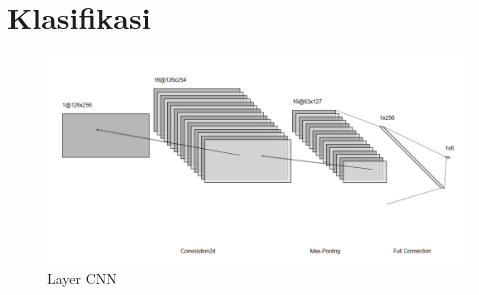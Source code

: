 \section{Klasifikasi}

\begin{figure}[!h]
  \centering
  \includegraphics[width=1\linewidth]{../Gambar/LayerCnn.png}
  \caption{Layer CNN}
  \label{fig:layerCNn}
\end{figure}

